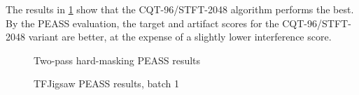 \documentclass[10pt,letter]{article}
\begin{document}
The results in \ref{fig:round2hard} show that the CQT-96/STFT-2048 algorithm performs the best. By the PEASS evaluation, the target and artifact scores for the CQT-96/STFT-2048 variant are better, at the expense of a slightly lower interference score.

\begin{figure}
	\centering
	\vspace{-1.25em}
	\caption{Two-pass hard-masking PEASS results}
	\label{fig:round2hard}
\end{figure}

\begin{figure}
	\centering
	\vspace{-1.25em}
	\caption{TFJigsaw PEASS results, batch 1}
	\label{fig:jigsaw1}
\end{figure}
\end{document}
